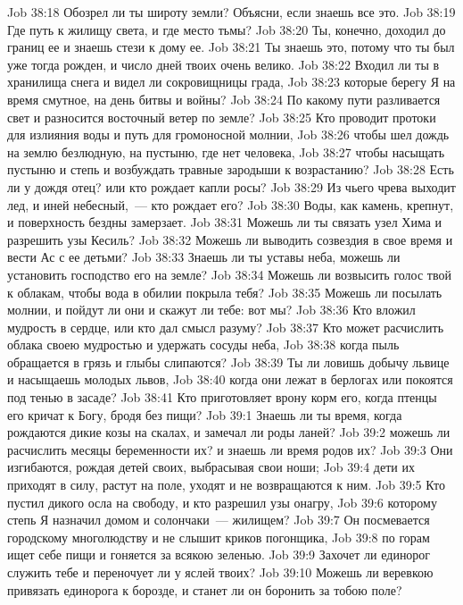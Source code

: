 \vs Job 38:18 Обозрел ли ты широту земли? Объясни, если знаешь все это.
\vs Job 38:19 Где путь к жилищу света, и где место тьмы?
\vs Job 38:20 Ты, конечно, доходил до границ ее и знаешь стези к дому ее.
\vs Job 38:21 Ты знаешь это, потому что ты был уже тогда рожден, и число дней твоих очень велико.
\vs Job 38:22 Входил ли ты в хранилища снега и видел ли сокровищницы града,
\vs Job 38:23 которые берегу Я на время смутное, на день битвы и войны?
\vs Job 38:24 По какому пути разливается свет и разносится восточный ветер по земле?
\vs Job 38:25 Кто проводит протоки для излияния воды и путь для громоносной молнии,
\vs Job 38:26 чтобы шел дождь на землю безлюдную, на пустыню, где нет человека,
\vs Job 38:27 чтобы насыщать пустыню и степь и возбуждать травные зародыши к возрастанию?
\vs Job 38:28 Есть ли у дождя отец? или кто рождает капли росы?
\vs Job 38:29 Из чьего чрева выходит лед, и иней небесный,~--- кто рождает его?
\vs Job 38:30 Воды, как камень, крепнут, и поверхность бездны замерзает.
\vs Job 38:31 Можешь ли ты связать узел Хима и разрешить узы Кесиль?
\vs Job 38:32 Можешь ли выводить созвездия в свое время и вести Ас с ее детьми?
\vs Job 38:33 Знаешь ли ты уставы неба, можешь ли установить господство его на земле?
\vs Job 38:34 Можешь ли возвысить голос твой к облакам, чтобы вода в обилии покрыла тебя?
\vs Job 38:35 Можешь ли посылать молнии, и пойдут ли они и скажут ли тебе: вот мы?
\vs Job 38:36 Кто вложил мудрость в сердце, или кто дал смысл разуму?
\vs Job 38:37 Кто может расчислить облака своею мудростью и удержать сосуды неба,
\vs Job 38:38 когда пыль обращается в грязь и глыбы слипаются?
\vs Job 38:39 Ты ли ловишь добычу львице и насыщаешь молодых львов,
\vs Job 38:40 когда они лежат в берлогах или покоятся под тенью в засаде?
\vs Job 38:41 Кто приготовляет врону корм его, когда птенцы его кричат к Богу, бродя без пищи?
\vs Job 39:1 Знаешь ли ты время, когда рождаются дикие козы на скалах, и замечал ли роды ланей?
\vs Job 39:2 можешь ли расчислить месяцы беременности их? и знаешь ли время родов их?
\vs Job 39:3 Они изгибаются, рождая детей своих, выбрасывая свои ноши;
\vs Job 39:4 дети их приходят в силу, растут на поле, уходят и не возвращаются к ним.
\vs Job 39:5 Кто пустил дикого осла на свободу, и кто разрешил узы онагру,
\vs Job 39:6 которому степь Я назначил домом и солончаки~--- жилищем?
\vs Job 39:7 Он посмевается городскому многолюдству и не слышит криков погонщика,
\vs Job 39:8 по горам ищет себе пищи и гоняется за всякою зеленью.
\vs Job 39:9 Захочет ли единорог служить тебе и переночует ли у яслей твоих?
\vs Job 39:10 Можешь ли веревкою привязать единорога к борозде, и станет ли он боронить за тобою поле?
